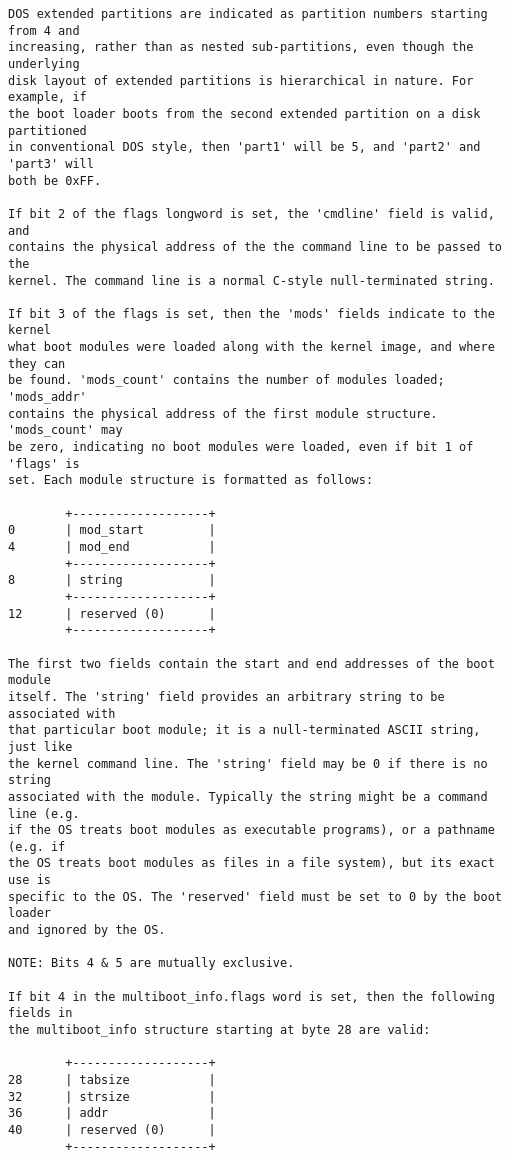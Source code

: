 \begin{verbatim}
DOS extended partitions are indicated as partition numbers starting from 4 and
increasing, rather than as nested sub-partitions, even though the underlying
disk layout of extended partitions is hierarchical in nature. For example, if
the boot loader boots from the second extended partition on a disk partitioned
in conventional DOS style, then 'part1' will be 5, and 'part2' and 'part3' will
both be 0xFF.

If bit 2 of the flags longword is set, the 'cmdline' field is valid, and
contains the physical address of the the command line to be passed to the
kernel. The command line is a normal C-style null-terminated string.

If bit 3 of the flags is set, then the 'mods' fields indicate to the kernel
what boot modules were loaded along with the kernel image, and where they can
be found. 'mods_count' contains the number of modules loaded; 'mods_addr'
contains the physical address of the first module structure. 'mods_count' may
be zero, indicating no boot modules were loaded, even if bit 1 of 'flags' is
set. Each module structure is formatted as follows:

        +-------------------+
0       | mod_start         |
4       | mod_end           |
        +-------------------+
8       | string            |
        +-------------------+
12      | reserved (0)      |
        +-------------------+

The first two fields contain the start and end addresses of the boot module
itself. The 'string' field provides an arbitrary string to be associated with
that particular boot module; it is a null-terminated ASCII string, just like
the kernel command line. The 'string' field may be 0 if there is no string
associated with the module. Typically the string might be a command line (e.g.
if the OS treats boot modules as executable programs), or a pathname (e.g. if
the OS treats boot modules as files in a file system), but its exact use is
specific to the OS. The 'reserved' field must be set to 0 by the boot loader
and ignored by the OS.

NOTE: Bits 4 & 5 are mutually exclusive.

If bit 4 in the multiboot_info.flags word is set, then the following fields in
the multiboot_info structure starting at byte 28 are valid:

        +-------------------+
28      | tabsize           |
32      | strsize           |
36      | addr              |
40      | reserved (0)      |
        +-------------------+


\end{verbatim}
